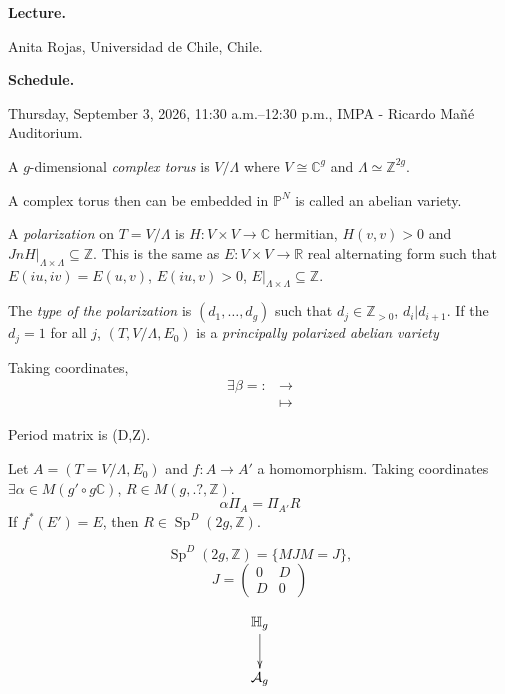 \medskip\noindent
{\bf Lecture.}

Anita Rojas,
Universidad de Chile, Chile.

\medskip\noindent
{\bf Schedule.}

Thursday, September 3, 2026,
11:30 a.m.--12:30 p.m.,
IMPA - Ricardo Ma\~n\'e Auditorium.


\begin{definition}
\label{definition-abelian}
A $g$-dimensional {\it complex torus} is
$V/\Lambda$ where $V \cong \mathbb{C}^g$
and $\Lambda \simeq \mathbb{Z}^{2g}$.
\end{definition}

\noindent
A complex torus then can be embedded
in $\mathbb{P}^N$ is called an abelian
variety.

\begin{definition}
\label{definition-polarization}
A {\it polarization} on $T=V/\Lambda$
is $H:V \times V \to \mathbb{C}$ hermitian,
$H(v,v)>0$ and
$J n H|_{\Lambda \times \Lambda}
\subseteq \mathbb{Z}$.
This is the same as $E:V \times V \to \mathbb{R}$
real alternating form such that
$E(iu,iv) = E(u,v)$,
$E(iu,v)>0$, $E|_{\Lambda \times \Lambda}
\subseteq \mathbb{Z}$.

The {\it type of the polarization}
is $(d_1,…,d_g)$ such that $d_j \in
\mathbb{Z}_{>0}$, $d_i|d_{i+1}$.
If the $d_j=1$ for all $j$, 
$(T,V/\Lambda,E_0)$ is a
{\it principally polarized abelian variety}
\end{definition}

\noindent
Taking coordinates,
$$
\begin{aligned}
\exists \beta=:  &\longrightarrow  \\
 &\longmapsto 
\end{aligned}
$$

Period matrix is (D,Z).

\medskip\noindent
Let $A=(T=V/\Lambda,E_0)$
and $f:A \to A'$ a homomorphism.
Taking coordinates
$\exists \alpha \in M(g'\circ g
\mathbb{C})$,
$R \in M(g,.?, \mathbb{Z})$.
$$
\alpha \Pi_A
=
\Pi_{A'}R
$$
If $f^*(E')=E$, then
$R \in \operatorname{Sp}^D(2g,\mathbb{Z})$.


$$
\operatorname{Sp}^D(2g,\mathbb{Z})
=\{M JM=J\},
$$
$$
J=\begin{pmatrix}0&D\\ D&0\end{pmatrix}
$$

$$
\xymatrix{
\mathbb{H}_g
\ar[d]\\
\mathcal{A}_g
}
$$



